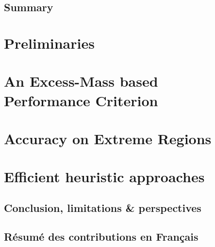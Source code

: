\documentclass{ecsthesis}      %
\begin{document}
\vfill\vfill\vfill\vfill\vfill\vfill\null
\clearpage

\mainmatter
\chapter{Summary}\label{chap:intro}


\part{Preliminaries}\label{part:background}


\part{An Excess-Mass based Performance Criterion}\label{part:struct}


\part{Accuracy on Extreme Regions}\label{part:vect}




\part{Efficient heuristic approaches}
\label{part:heuristic}




\chapter{Conclusion, limitations \& perspectives}\label{chap:concl}


\chapter{Résumé des contributions en Français}\label{chap:resume_fr}


\appendix
%
%
\backmatter
{\small


}
%
\end{document}
